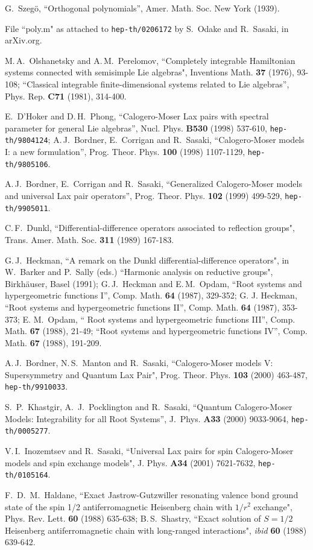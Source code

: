 \documentclass[a4paper,12pt]{article}
\begin{document}
\begin{thebibliography}{99}
G.~Szeg\"o,
``Orthogonal polynomials'',
Amer. Math. Soc. New York (1939).

File ``poly.m" as attached to {\tt hep-th/0206172} by
S.~Odake and R.~Sasaki, in arXiv.org.

M.\,A.~Olshanetsky and A.\,M.~Perelomov,
``Completely integrable Hamiltonian systems connected with semisimple
Lie algebras",
Inventions Math. {\bf 37} (1976), 93-108;
``Classical integrable finite-dimensional systems related to Lie algebras'',
Phys. Rep.  {\bf C71} (1981), 314-400.

E.~D'Hoker and D.\,H.~Phong,
``Calogero-Moser Lax pairs with spectral parameter for general Lie algebras'',
Nucl. Phys. {\bf B530} (1998) 537-610, {\tt hep-th/9804124};
A.\,J.~Bordner, E.~Corrigan and R.~Sasaki,
``Calogero-Moser models I: a new formulation'',
Prog. Theor. Phys. {\bf 100} (1998) 1107-1129, {\tt hep-th/9805106}.

A.\,J.~Bordner, E.~Corrigan and R.~Sasaki,
``Generalized Calogero-Moser models and  universal Lax pair operators'',
Prog. Theor. Phys. {\bf 102} (1999) 499-529,
{\tt  hep-th/9905011}.

C.\,F.~Dunkl, ``Differential-difference operators associated to reflection
groups",
Trans. Amer. Math. Soc. {\bf 311} (1989) 167-183.

G.\,J.~Heckman,
``A remark on the Dunkl differential-difference operators",
in W.~Barker and P.~Sally (eds.) ``Harmonic analysis on reductive groups",
Birkh\"auser, Basel (1991);
G.\,J.~Heckman and E.\,M.~Opdam,
``Root systems and hypergeometric functions I'',
Comp. Math. {\bf 64} (1987), 329-352;
G. J. Heckman,
``Root systems and hypergeometric functions II'',
Comp. Math. {\bf 64} (1987), 353-373;
E. M.~Opdam,
`` Root systems and hypergeometric functions III'',
Comp. Math. {\bf 67} (1988), 21-49;
``Root systems and hypergeometric functions IV'',
Comp.  Math. {\bf 67} (1988), 191-209.

A.\,J.~Bordner, N.\,S.~Manton and R.~Sasaki,
``Calogero-Moser models V:  Supersymmetry and Quantum Lax Pair",
Prog. Theor. Phys. {\bf 103} (2000) 463-487, {\tt hep-th/9910033}.

S.\, P.~Khastgir, A.\, J.~Pocklington and R.~Sasaki,
``Quantum Calogero-Moser Models: Integrability for all Root Systems'',
J.\ Phys. {\bf A33} (2000) 9033-9064, {\tt hep-th/0005277}.

V.\,I.~Inozemtsev and R.~Sasaki,
``Universal Lax pairs for spin Calogero-Moser models and spin
exchange models",
J. Phys. {\bf A34} (2001) 7621-7632, {\tt hep-th/0105164}.

F.\, D.\, M.~Haldane,
``Exact Jastrow-Gutzwiller resonating valence bond ground state of
the spin 1/2 antiferromagnetic Heisenberg chain with $1/r^2$ exchange",
Phys. Rev. Lett. {\bf 60} (1988) 635-638;
B.\,S.~Shastry,
``Exact solution of $S=1/2$ Heisenberg antiferromagnetic chain with
long-ranged interactions",
{\it ibid} {\bf 60} (1988) 639-642.

\end{thebibliography}
\end{document}
